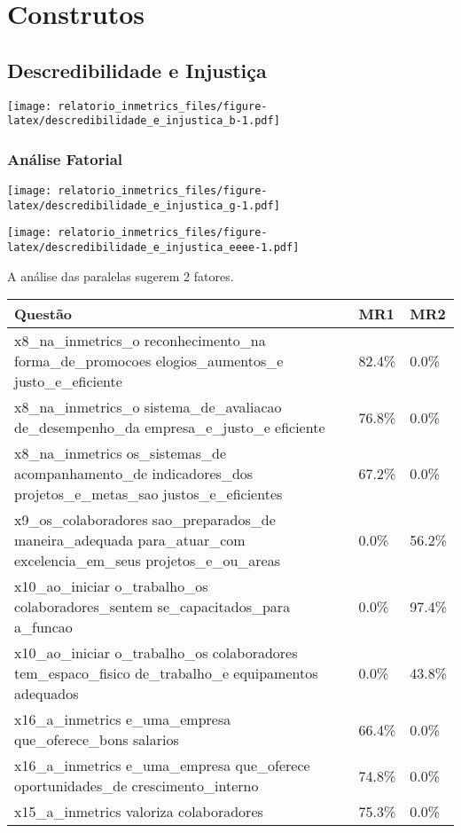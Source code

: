\documentclass[]{book}
\begin{document}
\hypertarget{construtos}{%
\chapter{Construtos}\label{construtos}}

\hypertarget{descredibilidade-e-injustica}{%
\section{Descredibilidade e Injustiça}\label{descredibilidade-e-injustica}}

\texttt{[image: relatorio\_inmetrics\_files/figure-latex/descredibilidade\_e\_injustica\_b-1.pdf]}

\hypertarget{analise-fatorial}{%
\subsection{Análise Fatorial}\label{analise-fatorial}}

\texttt{[image: relatorio\_inmetrics\_files/figure-latex/descredibilidade\_e\_injustica\_g-1.pdf]}

\texttt{[image: relatorio\_inmetrics\_files/figure-latex/descredibilidade\_e\_injustica\_eeee-1.pdf]}

A análise das paralelas sugerem 2 fatores.

\begin{table}[H]
\centering\begingroup\fontsize{12}{14}\selectfont

\begin{tabular}{>{\raggedright\arraybackslash}p{20em}ll}
\toprule
Questão & MR1 & MR2\\
\midrule
x8\_na\_inmetrics\_o
reconhecimento\_na
forma\_de\_promocoes
elogios\_aumentos\_e
justo\_e\_eficiente & 82.4\% & 0.0\%\\
x8\_na\_inmetrics\_o
sistema\_de\_avaliacao
de\_desempenho\_da
empresa\_e\_justo\_e
eficiente & 76.8\% & 0.0\%\\
x8\_na\_inmetrics
os\_sistemas\_de
acompanhamento\_de
indicadores\_dos
projetos\_e\_metas\_sao
justos\_e\_eficientes & 67.2\% & 0.0\%\\
x9\_os\_colaboradores
sao\_preparados\_de
maneira\_adequada
para\_atuar\_com
excelencia\_em\_seus
projetos\_e\_ou\_areas & 0.0\% & 56.2\%\\
x10\_ao\_iniciar
o\_trabalho\_os
colaboradores\_sentem
se\_capacitados\_para
a\_funcao & 0.0\% & 97.4\%\\
\addlinespace
x10\_ao\_iniciar
o\_trabalho\_os
colaboradores
tem\_espaco\_fisico
de\_trabalho\_e
equipamentos
adequados & 0.0\% & 43.8\%\\
x16\_a\_inmetrics
e\_uma\_empresa
que\_oferece\_bons
salarios & 66.4\% & 0.0\%\\
x16\_a\_inmetrics
e\_uma\_empresa
que\_oferece
oportunidades\_de
crescimento\_interno & 74.8\% & 0.0\%\\
x15\_a\_inmetrics
valoriza
colaboradores & 75.3\% & 0.0\%\\
\bottomrule
\end{tabular}
\endgroup{}
\end{table}
\end{document}
